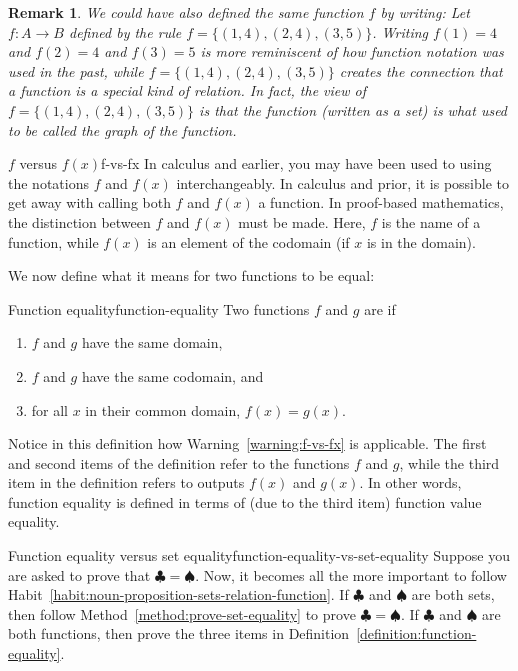 \documentclass{book}
\newcounter{ekcounter}%
\theoremstyle{ekimcustom}
\newtheorem{remark}[ekcounter]{Remark}
\newcommand\defn[1]{{\color{blue}{\bf #1}}}
\begin{document}
\begin{remark}
We could have also defined the same function $f$ by writing: Let $f : A \to B$ defined by the rule $f = \{(1,4),(2,4),(3,5)\}$. Writing $f(1)=4$ and $f(2)=4$ and $f(3)=5$ is more reminiscent of how function notation was used in the past, while $f = \{(1,4),(2,4),(3,5)\}$ creates the connection that a function is a special kind of relation. In fact, the view of $f = \{(1,4),(2,4),(3,5)\}$ is that the function (written as a set) is what used to be called the \emph{graph} of the function.
\end{remark}

\begin{bwarning}{$f$ versus $f(x)$}{f-vs-fx}
In calculus and earlier, you may have been used to using the notations $f$ and $f(x)$ interchangeably. In calculus and prior, it is possible to get away with calling both $f$ and $f(x)$ a function. In proof-based mathematics, the distinction between $f$ and $f(x)$ must be made. Here, $f$ is the name of a function, while $f(x)$ is an element of the codomain (if $x$ is in the domain).
\end{bwarning}

We now define what it means for two functions to be equal:
\begin{bdefinition}{Function equality}{function-equality}
Two functions $f$ and $g$ are \defn{equal} if
\begin{enumerate}
\item $f$ and $g$ have the same domain,
\item $f$ and $g$ have the same codomain, and
\item for all $x$ in their common domain, $f(x)=g(x)$.
\end{enumerate}
\end{bdefinition}
Notice in this definition how Warning~\ref{warning:f-vs-fx} is applicable. The first and second items of the definition refer to the functions $f$ and $g$, while the third item in the definition refers to outputs $f(x)$ and $g(x)$. In other words, function equality is defined in terms of (due to the third item) function value equality.

\begin{bwarning}{Function equality versus set equality}{function-equality-vs-set-equality}
Suppose you are asked to prove that $\clubsuit = \spadesuit$. Now, it becomes all the more important to follow Habit~\ref{habit:noun-proposition-sets-relation-function}. If $\clubsuit$ and $\spadesuit$ are both sets, then follow Method~\ref{method:prove-set-equality} to prove $\clubsuit = \spadesuit$. If $\clubsuit$ and $\spadesuit$ are both functions, then prove the three items in Definition~\ref{definition:function-equality}.
\end{bwarning}
\end{document}
